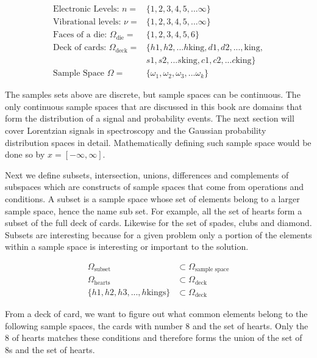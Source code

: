 \documentclass[11pt,a4paper]{book}
\begin{document}
		\begin{equation}
		\label{eq:examples of discrete sample spaces}
		\begin{split}
		\text{Electronic Levels: } n =& \{1, 2, 3 ,4 , 5,  ... \infty\}\\
		\text{Vibrational levels: } \nu =& \{1, 2, 3 , 4 , 5, ... \infty\}\\
		\text{Faces of a die: } \Omega_{\text{die}} =& \{1, 2, 3, 4, 5, 6 \}\\
		\text{Deck of cards: } \Omega_{\text{deck}} =& \{h1,h2,...h\text{king}, d1, d2,...,\text{king},\\ &s1,s2,...s\text{king}, c1, c2,...c\text{king}\}\\
		\text{Sample Space } \Omega =& \{\omega_1, \omega_2, \omega_3, ... \omega_k\}
		\end{split}
		\end{equation}
		
		The samples sets above are discrete, but sample spaces can be continuous. The only continuous sample spaces that are discussed in this book are domains that form the distribution of a signal and probability events. The next section will cover Lorentzian signals in spectroscopy and the Gaussian probability distribution spaces in detail. Mathematically defining such sample space would be done so by $x = [-\infty, \infty]$. 
		
		Next we define subsets, intersection, unions, differences and complements of subspaces which are constructs of sample spaces that come from operations and conditions. A subset is a sample space whose set of elements belong to a larger sample space, hence the name sub set. For example, all the set of hearts form a subset of the full deck of cards. Likewise for the set of spades, clubs and diamond. Subsets are interesting because for a given problem only a portion of the elements within a sample space is interesting or important to the solution. 
		
		\begin{equation}
		\begin{split}
		\Omega_{\text{subset}} &\subset \Omega_{\text{sample space}} \\
		\Omega_{\text{hearts}} &\subset \Omega_{\text{deck}} \\
		\{h1, h2, h3, ... , h\text{kings}\} & \subset \Omega_{\text{deck}}
		\end{split}
		\end{equation}
		
		\noindent From a deck of card, we want to figure out what common elements belong to the following sample spaces, the cards with number 8 and the set of hearts. Only the 8 of hearts matches these conditions and therefore forms the union of the set of 8s and the set of hearts. 
		
\end{document}
